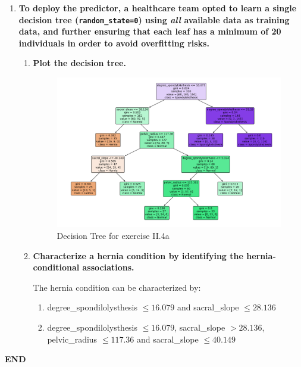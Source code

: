 \documentclass[12pt]{article}
\begin{document}
\begin{enumerate}[leftmargin=\labelsep]
    \item \textbf{To deploy the predictor, a healthcare team opted to learn a single decision tree
          (\texttt{random\_state=0}) using \textit{all} available data as training data, and further ensuring that each leaf has
          a minimum of 20 individuals in order to avoid overfitting risks.}
          \begin{enumerate}
          \item \textbf{Plot the decision tree.}

          \vskip 0.3cm
          

          \begin{figure}[H]
              \centering
              \includegraphics[width=\linewidth]{./assets/decision_tree_ex4a_PartII.png}
              \caption{Decision Tree for exercise II.4a}
              \label{fig:PartII-ex4a-plot}
          \end{figure}

          \item \textbf{Characterize a hernia condition by identifying the hernia-conditional associations.}

          \vskip 0.3cm

          The hernia condition can be characterized by:
          \begin{enumerate}
            \item degree\_spondilolysthesis $\leq 16.079$ and sacral\_slope $\leq 28.136$
            \item degree\_spondilolysthesis $\leq 16.079$, sacral\_slope $> 28.136$, pelvic\_radius $\leq 117.36$ and sacral\_slope $\leq 40.149$
          \end{enumerate}
          \end{enumerate}
\end{enumerate}

\vskip 1cm
\center\textbf{END}
\end{document}
